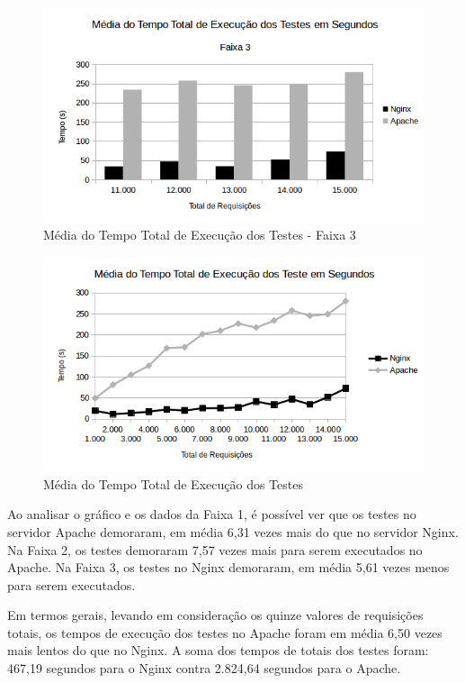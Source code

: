 \begin{figure}[H]
	\centering
	\includegraphics[width=1\linewidth]{graficos/grafico1-f3} 
	\caption{Média do Tempo Total de Execução dos Testes - Faixa 3}
	\label{fig:grafico1-f3}
\end{figure}

\begin{figure}[H]
	\centering
	\includegraphics[width=1\linewidth]{graficos/grafico1} 
	\caption{Média do Tempo Total de Execução dos Testes}
	\label{fig:grafico1}
\end{figure}

Ao analisar o gráfico e os dados da Faixa 1, é possível ver que os testes no 
servidor Apache demoraram, em média 6,31 vezes mais do que no servidor Nginx. 
Na Faixa 2, os testes demoraram 7,57 vezes mais para serem executados no 
Apache. Na Faixa 3, os testes no Nginx demoraram, em média 5,61 vezes menos 
para serem executados.

Em termos gerais, levando em consideração os quinze valores de requisições 
totais, os tempos de execução dos testes no Apache foram em média 6,50 vezes 
mais lentos do que no Nginx. A soma dos tempos de totais dos testes foram: 
467,19 segundos para o Nginx contra 2.824,64 segundos para o Apache.

